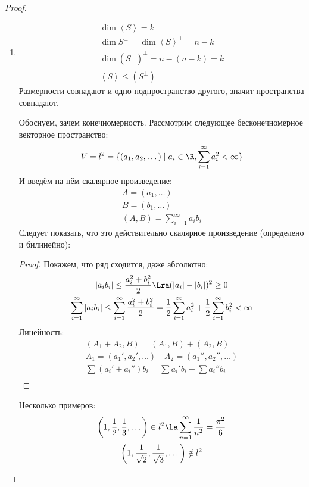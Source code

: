 \begin{proof}
\begin{enumerate}
	\item
		\begin{gather*}
			\dim \left<S\right> = k \\
			\dim S^\bot = \dim \left<S\right>^\bot = n - k \\
			\dim (S^\bot)^\bot = n - (n - k) = k \\
			\left<S\right> \le (S^\bot)^\bot
		\end{gather*}
		Размерности совпадают и одно подпространство другого, значит пространства совпадают.

		\begin{exmp}
			Обоснуем, зачем конечномерность.
			Рассмотрим следующее бесконечномерное векторное пространство:
			\[ V = l^2 = \{(a_1, a_2, \dots) \mid a_i \in \R, \sum_{i=1}^\infty a_i^2 < \infty\} \]
			И введём на нём скалярное произведение:
			\begin{gather*}
			A = (a_1, \dots) \\
			B = (b_1, \dots) \\
            (A, B) = \sum_{i = 1}^\infty a_i b_i
            \end{gather*}
            Следует показать, что это действительно скалярное произведение (определено и билинейно):
            \begin{proof}
				Покажем, что ряд сходится, даже абсолютно:
				\begin{gather*}
					|a_i b_i| \le \frac{a_i^2 + b_i^2}2 \Lra (|a_i| - |b_i|)^2 \ge 0 \\
					\sum_{i=1}^\infty |a_i b_i|
					\le \sum_{i=1}^\infty \frac{a_i^2 + b_i^2}2 = \frac12 \sum_{i = 1}^\infty a_i^2 + \frac12\sum_{i = 1}^\infty b_i^2 < \infty \\
				\end{gather*}
				Линейность:
				\begin{gather*}
					(A_1 + A_2, B) = (A_1, B) + (A_2, B) \\
					A_1 = (a_1', a_2', \dots) \quad A_2 = (a_1'', a_2'', \dots) \\
					\sum(a_i' + a_i'')b_i = \sum a_i'b_i + \sum a_i''b_i \\
				\end{gather*}
			\end{proof}
			Несколько примеров:
			\begin{gather*}
				\left(1, \frac12, \frac13, \dots\right) \in l^2
				\La
				\sum_{n = 1}^\infty \frac1{n^2} = \frac{\pi^2}6 \\
				\left(1, \frac1{\sqrt{2}}, \frac1{\sqrt{3}}, \dots\right) \notin l^2

\end{gather*}
\end{exmp}
\end{enumerate}
\end{proof}
